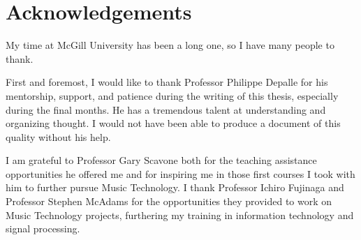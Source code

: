 \section*{Acknowledgements}
My time at McGill University has been a long one, so I have many people to thank.

First and foremost, I would like to thank Professor Philippe Depalle for his mentorship,
support, and patience during the writing of this thesis, especially during the
final months. He has a tremendous talent at understanding and organizing
thought. I would not have been able to produce a document of this quality
without his help.

I am grateful to Professor Gary Scavone both for the teaching assistance
opportunities he offered me and for inspiring me in those first courses I took
with him to further pursue Music Technology. I thank Professor Ichiro Fujinaga
and Professor Stephen McAdams for the opportunities they provided to work on
Music Technology projects, furthering my training in information technology and
signal processing.


